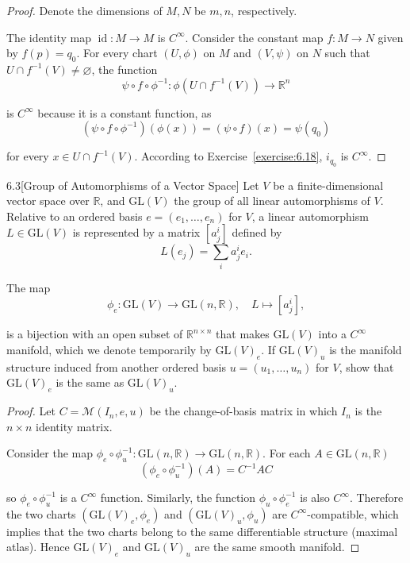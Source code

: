 \begin{proof}
    Denote the dimensions of \( M, N \) be \( m, n \), respectively.

    The identity map \( \operatorname{id}: M \to M \) is \( C^{\infty} \). Consider the constant map \( f: M \to N \) given by \( f(p) = q_{0} \). For every chart \( (U, \phi) \) on \( M \) and \( (V, \psi) \) on \( N \) such that \( U \cap f^{-1}(V) \ne \varnothing \), the function
    \[
        \psi \circ f \circ \phi^{-1}: \phi(U \cap f^{-1}(V)) \to \mathbb{R}^{n}
    \]

    is \( C^{\infty} \) because it is a constant function, as
    \[
        (\psi \circ f \circ \phi^{-1})(\phi(x)) = (\psi \circ f)(x) = \psi(q_{0})
    \]

    for every \( x \in U \cap f^{-1}(V) \). According to Exercise~\ref{exercise:6.18}, \( i_{q_{0}} \) is \( C^{\infty} \).
\end{proof}

\begin{problem}{6.3}[Group of Automorphisms of a Vector Space]
Let \(V\) be a finite-dimensional vector space over \(\mathbb{R}\), and \(\mathrm{GL}(V)\) the group of all linear automorphisms of \(V\). Relative to an ordered basis \(e = (e_{1}, \ldots, e_{n})\) for \(V\), a linear automorphism \(L \in \mathrm{GL}(V)\) is represented by a matrix \([a_{j}^{i}]\) defined by
\[
    L(e_{j}) = \sum_{i} a_{j}^{i} e_{i}.
\]

The map
\[
    \phi_{e} : \mathrm{GL}(V) \to \mathrm{GL}(n, \mathbb{R}), \quad L \mapsto [a_{j}^{i}],
\]

is a bijection with an open subset of \(\mathbb{R}^{n \times n}\) that makes \(\mathrm{GL}(V)\) into a \(C^{\infty}\) manifold, which we denote temporarily by \({\mathrm{GL}(V)}_{e}\). If \({\mathrm{GL}(V)}_{u}\) is the manifold structure induced from another ordered basis \(u = (u_{1}, \ldots, u_{n})\) for \(V\), show that \({\mathrm{GL}(V)}_{e}\) is the same as \({\mathrm{GL}(V)}_{u}\).
\end{problem}

\begin{proof}
    Let \( C = \mathcal{M}(I_{n}, e, u) \) be the change-of-basis matrix in which \( I_{n} \) is the \( n\times n \) identity matrix.

    Consider the map \( \phi_{e} \circ \phi_{u}^{-1}: \mathrm{GL}(n, \mathbb{R}) \to \mathrm{GL}(n, \mathbb{R}) \). For each \( A \in \mathrm{GL}(n, \mathbb{R}) \)
    \[
        (\phi_{e} \circ \phi_{u}^{-1})(A) = C^{-1}AC
    \]

    so \( \phi_{e} \circ \phi_{u}^{-1} \) is a \( C^{\infty} \) function. Similarly, the function \( \phi_{u} \circ \phi_{e}^{-1} \) is also \( C^{\infty} \). Therefore the two charts \( ({\mathrm{GL}(V)}_{e}, \phi_{e}) \) and \( ({\mathrm{GL}(V)}_{u}, \phi_{u}) \) are \( C^{\infty} \)-compatible, which implies that the two charts belong to the same differentiable structure (maximal atlas). Hence \( {\mathrm{GL}(V)}_{e} \) and \( {\mathrm{GL}(V)}_{u} \) are the same smooth manifold.
\end{proof}

